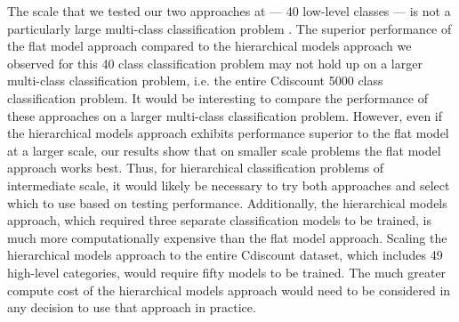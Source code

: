 The scale that we tested our two approaches at --- 40 low-level classes --- is not a particularly large multi-class classification problem \cite{deng2010does}.
The superior performance of the flat model approach compared to the hierarchical models approach we observed for this 40 class classification problem may not hold up on a larger multi-class classification problem, i.e. the entire Cdiscount 5000 class classification problem.
It would be interesting to compare the performance of these approaches on a larger multi-class classification problem.
However, even if the hierarchical models approach exhibits performance superior to the flat model at a larger scale, our results show that on smaller scale problems the flat model approach works best.
Thus, for hierarchical classification problems of intermediate scale, it would likely be necessary to try both approaches and select which to use based on testing performance.
Additionally, the hierarchical models approach, which required three separate classification models to be trained, is much more computationally expensive than the flat model approach.
Scaling the hierarchical models approach to the entire Cdiscount dataset, which includes 49 high-level categories, would require fifty models to be trained.
The much greater compute cost of the hierarchical models approach would need to be considered in any decision to use that approach in practice.